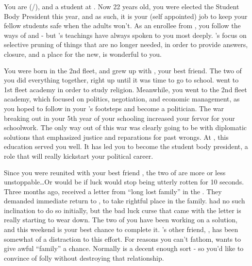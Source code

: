 \documentclass[char]{GL2020}
\begin{document}
\name{\cPresident{}}

You are \cPresident{} (\cPresident{\they}/\cPresident{\them}), and a student at \pSchool{}. Now 22 years old, you were elected the Student Body President this year, and as such, it is your (self appointed) job to keep your fellow students safe when the adults won't. As an enrollee from \pShip{}, you follow the ways of \cEbb{\full} and \cFlow{\full} - but \cEbb{}’s teachings have always spoken to you most deeply. \cEbb{}’s focus on selective pruning of things that are no longer needed, in order to provide answers, closure, and a place for the new, is wonderful to you.

You were born in the 2nd fleet, and grew up with \cInitiate{}, your best friend. The two of you did everything together, right up until it was time to go to school. \cInitiate{\they} went to 1st fleet academy in order to study religion. Meanwhile, you went to the 2nd fleet academy, which focused on politics, negotiation, and economic management, as you hoped to follow in your \cHeadDiplomat{\auncle}'s footsteps and become a politician. The war breaking out in your 5th year of your schooling increased your fervor for your schoolwork. The only way out of this war was clearly going to be with diplomatic solutions that emphasized justice and reparations for past wrongs. At \pSchool{}, this education served you well. It has led you to become the student body president, a role that will really kickstart your political career. 

Since you were reunited with your best friend \cInitiate{}, the two of are more or less unstoppable\ldots Or would be if \cInitiate{\their} luck would stop being utterly rotten for 10 seconds. Three months ago, \cInitiate{} received a letter from ``long lost family'' in the \pFarm{}. They demanded \cInitiate{\their} immediate return to \pFarm{}, to take \cInitiate{\their} rightful place in the family. \cInitiate{} had no such inclination to do so initially, but the bad luck curse that came with the letter is really starting to wear \cInitiate{\them} down. The two of you have been working on a solution, and this weekend is your best chance to complete it. \cInitiate{}’s other friend, \cWarlordDaughter{}, has been somewhat of a distraction to this effort. For reasons you can’t fathom,  \cWarlordDaughter{} wants \cInitiate{} to give \cInitiate{\their} awful ``family'' a chance. Normally \cWarlordDaughter{} is a decent enough sort - so you’d like to convince \cWarlordDaughter{} of \cWarlordDaughter{\their} folly without destroying that relationship.
\end{document}
